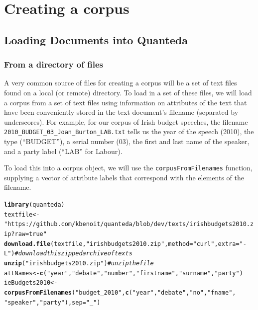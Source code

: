 \documentclass[11pt]{article}\usepackage[]{graphicx}\usepackage[]{color}
\makeatletter
\newcommand{\hlstr}[1]{\textcolor[rgb]{0.192,0.494,0.8}{#1}}%
\newcommand{\hlcom}[1]{\textcolor[rgb]{0.678,0.584,0.686}{\textit{#1}}}%
\newcommand{\hlstd}[1]{\textcolor[rgb]{0.345,0.345,0.345}{#1}}%
\newcommand{\hlkwb}[1]{\textcolor[rgb]{0.69,0.353,0.396}{#1}}%
\newcommand{\hlkwc}[1]{\textcolor[rgb]{0.333,0.667,0.333}{#1}}%
\newcommand{\hlkwd}[1]{\textcolor[rgb]{0.737,0.353,0.396}{\textbf{#1}}}%
\newenvironment{kframe}{%
 \def\at@end@of@kframe{}%
 \ifinner\ifhmode%
  \def\at@end@of@kframe{\end{minipage}}%
  \begin{minipage}{\columnwidth}%
 \fi\fi%
 \def\FrameCommand##1{\hskip\@totalleftmargin \hskip-\fboxsep
 \colorbox{shadecolor}{##1}\hskip-\fboxsep
     \hskip-\linewidth \hskip-\@totalleftmargin \hskip\columnwidth}%
 \MakeFramed {\advance\hsize-\width
   \@totalleftmargin\z@ \linewidth\hsize
   \@setminipage}}%
 {\par\unskip\endMakeFramed%
 \at@end@of@kframe}
\newenvironment{knitrout}{}{} %
\makeatother
\begin{document}
\section{Creating a corpus}

\subsection{Loading Documents into Quanteda}

\subsubsection{From a directory of files}

A very common source of files for creating a corpus will be a set of
text files found on a local (or remote) directory.  To load in a set
of these files, we will load a corpus from a set of text files using
information on attributes of the text that have been conveniently
stored in the text document's filename (separated by underscores).
For example, for our corpus of Irish budget speeches, the filename
\texttt{2010\_BUDGET\_03\_Joan\_Burton\_LAB.txt} tells us the year of
the speech (2010), the type (``BUDGET''), a serial number (03), the
first and last name of the speaker, and a party label (``LAB'' for
Labour).

To load this into a corpus object, we will use the
\texttt{corpusFromFilenames} function, supplying a vector of attribute
labels that correspond with the elements of the filename.

\begin{knitrout}
\color{fgcolor}\begin{kframe}
\begin{alltt}
\hlkwd{library}\hlstd{(quanteda)}
\hlstd{textfile} \hlkwb{<-} \hlstr{"https://github.com/kbenoit/quanteda/blob/dev/texts/irishbudgets2010.zip?raw=true"}
\hlkwd{download.file}\hlstd{(textfile,} \hlstr{"irishbudgets2010.zip"}\hlstd{,} \hlkwc{method} \hlstd{=} \hlstr{"curl"}\hlstd{,} \hlkwc{extra} \hlstd{=} \hlstr{"-L"}\hlstd{)}  \hlcom{# download this zipped archive of texts}
\hlkwd{unzip}\hlstd{(}\hlstr{"irishbudgets2010.zip"}\hlstd{)}  \hlcom{# unzip the file}
\hlstd{attNames} \hlkwb{<-} \hlkwd{c}\hlstd{(}\hlstr{"year"}\hlstd{,} \hlstr{"debate"}\hlstd{,} \hlstr{"number"}\hlstd{,} \hlstr{"firstname"}\hlstd{,} \hlstr{"surname"}\hlstd{,} \hlstr{"party"}\hlstd{)}
\hlstd{ieBudgets2010} \hlkwb{<-} \hlkwd{corpusFromFilenames}\hlstd{(}\hlstr{"budget_2010"}\hlstd{,} \hlkwd{c}\hlstd{(}\hlstr{"year"}\hlstd{,} \hlstr{"debate"}\hlstd{,} \hlstr{"no"}\hlstd{,} \hlstr{"fname"}\hlstd{,}
    \hlstr{"speaker"}\hlstd{,} \hlstr{"party"}\hlstd{),} \hlkwc{sep} \hlstd{=} \hlstr{"_"}\hlstd{)}
\end{alltt}
\end{kframe}
\end{knitrout}
\end{document}
